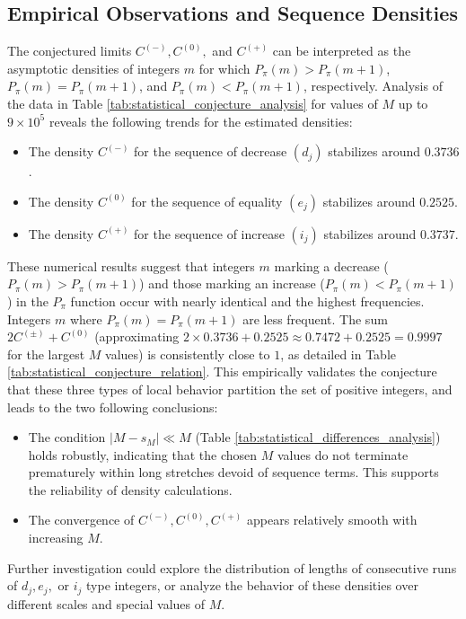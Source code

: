 \documentclass[]{article}
\theoremstyle{plain}%
\theoremstyle{definition}
\theoremstyle{remark}
\begin{document}
\subsection{Empirical Observations and Sequence Densities}
The conjectured limits $C^{(-)}, C^{(0)},$ and $C^{(+)}$ can be interpreted as the asymptotic densities of integers $m$ for which $P_{\pi}(m) > P_{\pi}(m+1)$, $P_{\pi}(m) = P_{\pi}(m+1)$, and $P_{\pi}(m) < P_{\pi}(m+1)$, respectively.
Analysis of the data in Table \ref{tab:statistical_conjecture_analysis} for values of $M$ up to $9 \times 10^5$ reveals the following trends for the estimated densities:
\begin{itemize}
	\item The density $C^{(-)}$ for the sequence of decrease $(d_j)$ stabilizes around $0.3736$.
	\item The density $C^{(0)}$ for the sequence of equality $(e_j)$ stabilizes around $0.2525$.
	\item The density $C^{(+)}$ for the sequence of increase $(i_j)$ stabilizes around $0.3737$.
\end{itemize}
These numerical results suggest that integers $m$ marking a decrease ($P_{\pi}(m) > P_{\pi}(m+1)$) and those marking an increase ($P_{\pi}(m) < P_{\pi}(m+1)$) in the $P_{\pi}$ function occur with nearly identical and the highest frequencies. Integers $m$ where $P_{\pi}(m) = P_{\pi}(m+1)$ are less frequent. The sum $2C^{(\pm)} + C^{(0)}$ (approximating $2 \times 0.3736 + 0.2525 \approx 0.7472 + 0.2525 = 0.9997$ for the largest $M$ values) is consistently close to $1$, as detailed in Table \ref{tab:statistical_conjecture_relation}. This empirically validates the conjecture that these three types of local behavior partition the set of positive integers, and leads to the two following conclusions:
\begin{itemize}
	\item The condition $|M-s_M| \ll M$ (Table \ref{tab:statistical_differences_analysis}) holds robustly, indicating that the chosen $M$ values do not terminate prematurely within long stretches devoid of sequence terms. This supports the reliability of density calculations.
	\item The convergence of $C^{(-)}, C^{(0)}, C^{(+)}$ appears relatively smooth with increasing $M$.
\end{itemize}
Further investigation could explore the distribution of lengths of consecutive runs of $d_j, e_j,$ or $i_j$ type integers, or analyze the behavior of these densities over different scales and special values of $M$.
\end{document}
